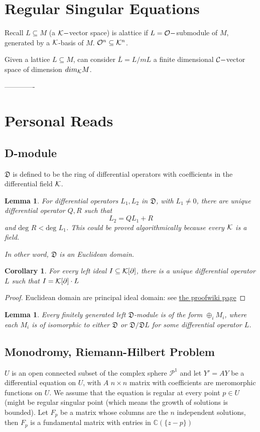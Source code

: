 \documentclass[11pt]{article}
\newtheorem{lemma}[thm]{Lemma}
\newtheorem{cor}[thm]{Corollary}
\newcommand{\pd}{\partial}
\newcommand{\cplx}{\mathbb C}
\newcommand{\frakd}{{\mathfrak D}}
\newcommand{\calc}{{\cal C}}
\newcommand{\calk}{{\cal K}}
\newcommand{\calo}{{\cal O}}
\begin{document}
\section{Regular Singular Equations}
Recall $L\subseteq M$ (a $\calk-$vector space) is  alattice if $L=\calo-$submodule of $M$, generated by a $\calk$-basis of $M$. $\calo^n\subseteq \calk^n$.

Given a lattice $L\subseteq M$, can consider $\overline{L}=L/mL$ a finite dimensional $\calc-$vector space of dimension $dim_\calk M$.









-------------
\section{Personal Reads}
\subsection{D-module}
$\frakd$ is defined to be the ring of differential operators with coefficients in the differential field $\calk$.
\begin{lemma}
For differential operators $L_1,L_2$ in $\frakd$, with $L_1\neq 0$, there are unique differential operator $Q,R$ such that 
$$
L_2=Q L_1+R
$$
and $\text{deg } R<\text{deg } L_1$. This could be proved algorithmically because every $\calk$ is a field.

In other word, $\frakd$ is  an Euclidean domain.
\end{lemma}
\begin{cor}
For every left ideal $I\subseteq \calk[\pd]$, there is a unique differential operator $L$ such that $I=\calk[\pd]\cdot L$
\end{cor}
\begin{proof}
Euclidean domain are principal ideal domain: see \href{https://proofwiki.org/wiki/Euclidean_Domain_is_Principal_Ideal_Domain}{the proofwiki page}
\end{proof}
\begin{lemma}
Every finitely generated left $\frakd$-module is of the form $\oplus_i M_i$, where each $M_i$ is of isomorphic to either $\frakd$ or $\frakd/\frakd L$ for some differential operator $L$.
\end{lemma}
\subsection{Monodromy, Riemann-Hilbert Problem}
$U$ is an open connected subset of the complex sphere $\mathcal{P}^1$ and let $Y'=AY$ be a differential equation on $U$, with $ A$ $n\times n$ matrix with coefficients are meromorphic functions on $U$. We assume that the equation is regular at every point $p\in U$ (might be regular singular point (which means the growth of solutions is bounded). Let $F_p$ be a matrix whose columns are the $n$ independent solutions, then $F_p$ is a fundamental matrix with entries in $\cplx(\{z-p\})$
\end{document}
